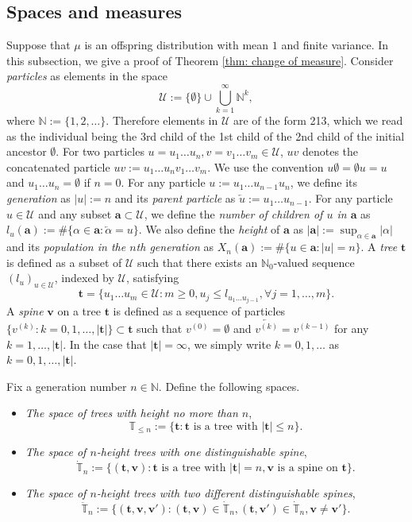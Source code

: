 \documentclass[UTF8]{pkuthss}
\theoremstyle{plain}
\theoremstyle{definition}
\numberwithin{equation}{section}
\begin{document}
\subsection{Spaces and measures}
\label{sec:spacesandmeasures}
	Suppose that $\mu$ is an offspring distribution with mean $1$ and finite variance. In this subsection, we give a proof of Theorem \ref{thm: change of measure}.
Consider \emph{particles} as elements in the space
\[
\mathcal U
:=
\{\emptyset\}\cup\bigcup_{k=1}^\infty \mathbb N^k,
\]
where $\mathbb N:=\{1,2,\dots\}$.
Therefore elements in $\mathcal U$ are of the form 213, which we read as the individual being the 3rd child of the 1st child of the 2nd child of the initial ancestor $\emptyset$.
For two particles $u=u_1\dots u_n, v=v_1\dots v_m\in\mathcal U$, $uv$ denotes the concatenated particle $uv:=u_1\dots u_nv_1\dots v_m$.
We use the convention $u\emptyset = \emptyset u = u$ and $u_1\dots u_n=\emptyset$ if $n=0$.
For any particle $u:=u_1\dots u_{n-1}u_n$, we define its \emph{generation} as $| u |:=n$ and its \emph{parent particle} as $\overleftarrow{u}:=u_1\dots u_{n-1}$.
For any particle $u \in \mathcal U$ and any subset $\mathbf a \subset \mathcal U$, we define the \emph{number of children of $u$ in $\mathbf a$} as $l_u(\mathbf a) := \#\{\alpha\in \mathbf a:\overleftarrow{\alpha}=u\} $.
We also define the \emph{height} of $\mathbf a$ as $|\mathbf a|:=\sup_{\alpha\in \mathbf a}|\alpha|$ and its \emph{population in the $n$th generation} as $X_n(\mathbf a):=\#\{u\in \mathbf a:|u|=n\}$.
A \emph{tree} $ \mathbf t $ is defined as a subset of $\mathcal U$ such that there exists an $\mathbb N_0$-valued sequence $(l_u)_{u\in \mathcal U}$,
indexed by $\mathcal U$, satisfying
\[
\mathbf t
=\{u_1\dots u_m\in \mathcal U: m\ge 0, u_j\leq l_{u_1\dots u_{j-1}}, \forall  j=1,\dots,m\}.
\]
A \emph{spine} $ \mathbf v$ on a  tree $ \mathbf t $ is defined as a sequence of particles $\{v^{(k)}:k=0,1,\dots,| \mathbf t |\}\subset \mathbf t $ such that $v^{(0)}=\emptyset$ and $\overleftarrow{v^{(k)}}=v^{(k-1)}$ for any $k=1,\dots, | \mathbf t |$.
In the case that $| \mathbf t |=\infty$, we simply write $k=0,1,\dots$ as $k=0,1,\dots, | \mathbf t |$.

Fix a generation number $n\in \mathbb N$. Define the following spaces.
\begin{itemize}
	\item
	\emph{The space of trees with height no more than $n$},
	\[
	\mathbb T_{\leq n}
	:=\{ \mathbf t : \mathbf t \text{ is a tree with }| \mathbf t | \leq n\}.
	\]
	\item
	\emph {The space of $n$-height trees with one distinguishable spine},
	\[
	\dot{\mathbb T}_n
	:=\{( \mathbf t , \mathbf v): \mathbf t  \text{ is a tree with } | \mathbf t |=n,  \mathbf v \text{ is a spine on }  \mathbf t \}.
	\]
	\item
	\emph{The space of $n$-height trees with two different distinguishable spines},
	\[
	\ddot{\mathbb T}_n
	:=\{( \mathbf t , \mathbf v, \mathbf v'):( \mathbf t , \mathbf v)\in\dot{\mathbb T}_n,( \mathbf t , \mathbf v')\in\dot{\mathbb T}_n, \mathbf v\neq \mathbf v'\}.
	\]
\end{itemize}
\end{document}
